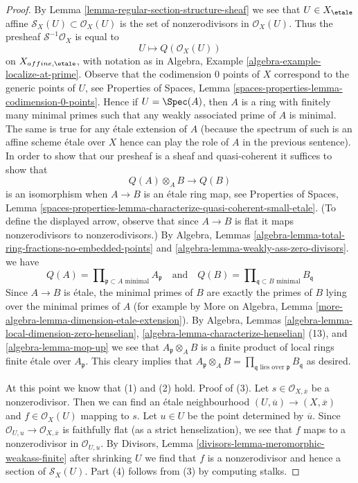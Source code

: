 \begin{proof}
By Lemma \ref{lemma-regular-section-structure-sheaf}
we see that $U \in X_\etale$ affine
$\mathcal{S}_X(U) \subset \mathcal{O}_X(U)$
is the set of nonzerodivisors in $\mathcal{O}_X(U)$.
Thus the presheaf $\mathcal{S}^{-1}\mathcal{O}_X$ is equal to
$$
U \longmapsto Q(\mathcal{O}_X(U))
$$
on $X_{affine, \etale}$, with notation as in
Algebra, Example \ref{algebra-example-localize-at-prime}.
Observe that the codimension $0$ points of $X$ correspond
to the generic points of $U$, see
Properties of Spaces, Lemma \ref{spaces-properties-lemma-codimension-0-points}.
Hence if $U = \Spec(A)$, then $A$ is a ring with finitely many minimal primes
such that any weakly associated prime of $A$ is minimal.
The same is true for any \'etale extension of $A$ (because the
spectrum of such is an affine scheme \'etale over $X$ hence can
play the role of $A$ in the previous sentence).
In order to show that our presheaf is a sheaf and quasi-coherent
it suffices to show that
$$
Q(A) \otimes_A B \longrightarrow Q(B)
$$
is an isomorphism when $A \to B$ is an \'etale ring map, see
Properties of Spaces, Lemma
\ref{spaces-properties-lemma-characterize-quasi-coherent-small-etale}.
(To define the displayed arrow, observe that since $A \to B$
is flat it maps nonzerodivisors to nonzerodivisors.)
By Algebra, Lemmas
\ref{algebra-lemma-total-ring-fractions-no-embedded-points} and
\ref{algebra-lemma-weakly-ass-zero-divisors}.
we have
$$
Q(A) = \prod\nolimits_{\mathfrak p \subset A\text{ minimal}} A_\mathfrak p
\quad\text{and}\quad
Q(B) = \prod\nolimits_{\mathfrak q \subset B\text{ minimal}} B_\mathfrak q
$$
Since $A \to B$ is \'etale, the minimal primes of $B$ are exactly the
primes of $B$ lying over the minimal primes
of $A$ (for example by More on Algebra, Lemma
\ref{more-algebra-lemma-dimension-etale-extension}).
By Algebra, Lemmas \ref{algebra-lemma-local-dimension-zero-henselian},
\ref{algebra-lemma-characterize-henselian} (13), and
\ref{algebra-lemma-mop-up} we see that $A_\mathfrak p \otimes_A B$
is a finite product of local rings finite \'etale over $A_\mathfrak p$.
This cleary implies that $A_\mathfrak p \otimes_A B =
\prod_{\mathfrak q\text{ lies over }\mathfrak p} B_\mathfrak q$
as desired.

\medskip\noindent
At this point we know that (1) and (2) hold.
Proof of (3). Let $s \in \mathcal{O}_{X, \overline{x}}$
be a nonzerodivisor. Then we can find an \'etale neighbourhood
$(U, \overline{u}) \to (X, \overline{x})$
and $f \in \mathcal{O}_X(U)$ mapping to $s$.
Let $u \in U$ be the point determined by $\overline{u}$.
Since $\mathcal{O}_{U, u} \to \mathcal{O}_{X, \overline{x}}$
is faithfully flat (as a strict henselization), we see that
$f$ maps to a nonzerodivisor in $\mathcal{O}_{U, u}$.
By Divisors, Lemma \ref{divisors-lemma-meromorphic-weakass-finite}
after shrinking $U$ we find that $f$ is a nonzerodivisor
and hence a section of $\mathcal{S}_X(U)$.
Part (4) follows from (3) by computing stalks.
\end{proof}

